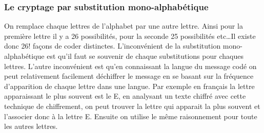 \documentclass[a4paper,12pt]{article}
\begin{document}
	\subsubsection{Le cryptage par substitution mono-alphabétique}
	On remplace chaque lettres de l'alphabet par une autre lettre. Ainsi pour la première lettre il y a 26 possibilités, pour la seconde 25 possibilités etc\dots Il existe donc 26! façons de coder distinctes. L'inconvénient de la substitution mono-alphabétique est qu'il faut se souvenir de chaque substitutions pour chaques lettres. L'autre inconvénient est qu'en connaissant la langue du message codé on peut relativement facilement déchiffrer le message en se basant sur la fréquence d'apparition de chaque lettre dans une langue. Par exemple en français la lettre apparaissant le plus souvent est le E, en analysant un texte chiffré avec cette technique de chiffrement, on peut trouver la lettre qui apparait la plus souvent et l'associer donc à la lettre E. Ensuite on utilise le même raisonnement pour toute les autres lettres.
\end{document}
